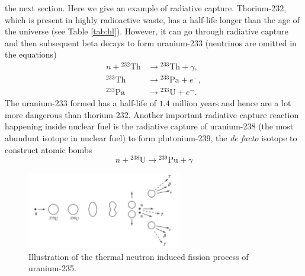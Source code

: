 \documentclass[nofootinbib,preprint,aps]{revtex4-1}
\begin{document}
    the next section. Here we give an example of radiative capture. Thorium-232, which is present in highly radioactive
    waste, has a half-life longer than the age of the universe (see Table \ref{tab:hl}). However, it can go through
    radiative capture and then subsequent beta decays to form uranium-233 (neutrinos are omitted in the equations)
    \begin{align}
        n + {}^{232}\text{Th} &\rightarrow {}^{233}\text{Th} + \gamma,\\
        {}^{233}\text{Th} &\rightarrow {}^{233}\text{Pa} + e^-,\\
        {}^{233}\text{Pa} &\rightarrow {}^{233}\text{U} + e^-.
    \end{align}
    The uranium-233 formed has a half-life of $1.4$ million years and hence are a lot more dangerous than
    thorium-232. Another important radiative capture reaction happening inside nuclear fuel is the radiative
    capture of uranium-238 (the most abundunt isotope in nuclear fuel) to form plutonium-239, the {\it de facto}
    isotope to construct atomic bombs
    \begin{equation}
        n + {}^{238}\text{U} \rightarrow {}^{239}\text{Pu} + \gamma
    \end{equation}
        \begin{figure}[h]
            \centering
            \includegraphics[width=0.6\textwidth]{fission.png}
            \caption{Illustration of the thermal neutron induced fission process of uranium-235.\cite{l01}}
            \label{fig:fission}
        \end{figure}
\end{document}
